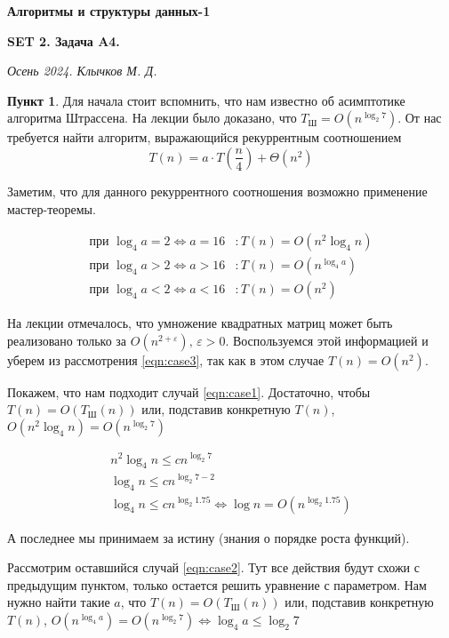\documentclass[11pt,a4paper]{scrarticle}
\author{Клычков Максим Дмитриевич}
\theoremstyle{definition}
\newtheorem{subtask}{Пункт}
\begin{document}
\centerline{\textbf{\huge Алгоритмы и структуры данных-1}}
\centerline{\textbf{SET 2. Задача A4.}}
\begin{flushright}
  \emph{Осень 2024. Клычков М. Д.}
\end{flushright}

\begin{subtask}
  Для начала стоит вспомнить, что нам известно об асимптотике алгоритма Штрассена. На лекции было доказано, что $T_\text{Ш} = O(n^{\log_2 7})$. От нас требуется найти алгоритм, выражающийся рекуррентным соотношением
  \begin{equation}
    \label{eqn:t}
    T(n) = a \cdot T\left(\frac{n}{4}\right) + \Theta(n^2)
  \end{equation}

  Заметим, что для данного рекуррентного соотношения возможно применение мастер-теоремы.

  \begin{align}
    \label{eqn:case1} \text{при } \log_4 a = 2 \Leftrightarrow a = 16 & \colon T(n) = O(n^2 \log_4 n) \\
    \label{eqn:case2} \text{при } \log_4 a > 2 \Leftrightarrow a > 16 & \colon T(n) = O(n^{\log_4 a}) \\
    \label{eqn:case3} \text{при } \log_4 a < 2 \Leftrightarrow a < 16 & \colon T(n) = O(n^2)
  \end{align}


  На лекции отмечалось, что умножение квадратных матриц может быть реализовано только за $O(n^{2+\varepsilon}), \, \varepsilon > 0$. Воспользуемся этой информацией и уберем из рассмотрения \eqref{eqn:case3}, так как в этом случае $T(n) = O(n^2)$.

  Покажем, что нам подходит случай \eqref{eqn:case1}. Достаточно, чтобы $T(n) = O(T_\text{Ш}(n))$ или, подставив конкретную $T(n)$, $O(n^2 \log_4 n) = O(n^{\log_2 7})$

  \begin{gather*}
    n^2 \log_4 n \leq c n^{\log_2 7} \\
    \log_4 n \leq c n^{\log_2 7 - 2} \\
    \log_4 n \leq c n^{\log_2 1.75} \Leftrightarrow \log n = O(n^{\log_2 1.75})
  \end{gather*}

  А последнее мы принимаем за истину (знания о порядке роста функций).

  Рассмотрим оставшийся случай \eqref{eqn:case2}. Тут все действия будут схожи с предыдущим пунктом, только остается решить уравнение с параметром.
  Нам нужно найти такие $a$, что $T(n) = O(T_\text{Ш}(n))$ или, подставив конкретную $T(n)$, $O(n^{\log_4 a}) = O(n^{\log_2 7}) \Leftrightarrow \log_4 a \leq \log_2 7$


\end{subtask}
\end{document}
